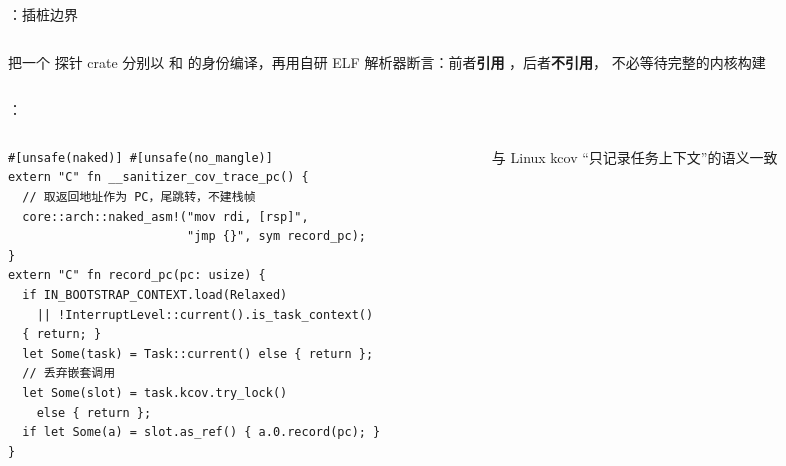 \begin{frame}[fragile]{\sa{}：插桩边界}
\begin{columns}[T,onlytextwidth]
\begin{column}{0.54\textwidth}
\vspace{2mm}
\begin{tcolorbox}[accentcard,title={\faIcon{check-circle}\ 秒级前置校验：\code{check-kcov-inst}}]
  把一个 \code{\#![no\_std]} 探针 crate 分别以  和 
  的身份编译，再用自研 ELF 解析器断言：前者\textbf{引用}
  ，后者\textbf{不引用}，
  不必等待完整的内核构建
\end{tcolorbox}
\end{column}
\end{columns}
\end{frame}

\begin{frame}[fragile]{\sa{}：}
\begin{columns}[T,onlytextwidth]
\begin{column}{0.56\textwidth}
\begin{lstlisting}
#[unsafe(naked)] #[unsafe(no_mangle)]
extern "C" fn __sanitizer_cov_trace_pc() {
  // 取返回地址作为 PC，尾跳转，不建栈帧
  core::arch::naked_asm!("mov rdi, [rsp]",
                         "jmp {}", sym record_pc);
}
extern "C" fn record_pc(pc: usize) {
  if IN_BOOTSTRAP_CONTEXT.load(Relaxed)
    || !InterruptLevel::current().is_task_context()
  { return; }
  let Some(task) = Task::current() else { return };
  // 丢弃嵌套调用
  let Some(slot) = task.kcov.try_lock()
    else { return };
  if let Some(a) = slot.as_ref() { a.0.record(pc); }
}
\end{lstlisting}
\end{column}
\begin{column}{0.41\textwidth}
\centering
{}

\vspace{2mm}
\begin{tcolorbox}[accentcard]
  与 Linux kcov “只记录任务上下文”的语义一致
\end{tcolorbox}
\end{column}
\end{columns}
\end{frame}

